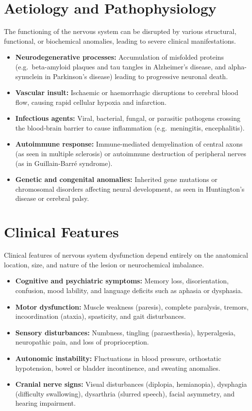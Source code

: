 \section*{Aetiology and Pathophysiology}
The functioning of the nervous system can be disrupted by various structural, functional, or biochemical anomalies, leading to severe clinical manifestations.
\begin{itemize}
    \item \textbf{Neurodegenerative processes:} Accumulation of misfolded proteins (e.g.\ beta-amyloid plaques and tau tangles in Alzheimer's disease, and alpha-synuclein in Parkinson's disease) leading to progressive neuronal death.
    \item \textbf{Vascular insult:} Ischaemic or haemorrhagic disruptions to cerebral blood flow, causing rapid cellular hypoxia and infarction.
    \item \textbf{Infectious agents:} Viral, bacterial, fungal, or parasitic pathogens crossing the blood-brain barrier to cause inflammation (e.g.\ meningitis, encephalitis).
    \item \textbf{Autoimmune response:} Immune-mediated demyelination of central axons (as seen in multiple sclerosis) or autoimmune destruction of peripheral nerves (as in Guillain-Barré syndrome).
    \item \textbf{Genetic and congenital anomalies:} Inherited gene mutations or chromosomal disorders affecting neural development, as seen in Huntington's disease or cerebral palsy.
\end{itemize}

\section*{Clinical Features}
Clinical features of nervous system dysfunction depend entirely on the anatomical location, size, and nature of the lesion or neurochemical imbalance.
\begin{itemize}
    \item \textbf{Cognitive and psychiatric symptoms:} Memory loss, disorientation, confusion, mood lability, and language deficits such as aphasia or dysphasia.
    \item \textbf{Motor dysfunction:} Muscle weakness (paresis), complete paralysis, tremors, incoordination (ataxia), spasticity, and gait disturbances.
    \item \textbf{Sensory disturbances:} Numbness, tingling (paraesthesia), hyperalgesia, neuropathic pain, and loss of proprioception.
    \item \textbf{Autonomic instability:} Fluctuations in blood pressure, orthostatic hypotension, bowel or bladder incontinence, and sweating anomalies.
    \item \textbf{Cranial nerve signs:} Visual disturbances (diplopia, hemianopia), dysphagia (difficulty swallowing), dysarthria (slurred speech), facial asymmetry, and hearing impairment.
\end{itemize}

